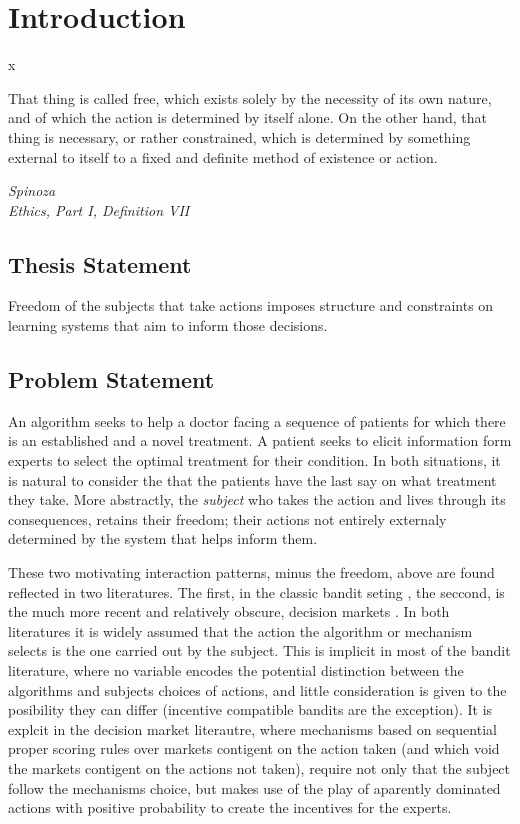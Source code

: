\chapter{Introduction}x
\label{cha:intro}



\epigraph{
That thing is called free, which exists solely by the necessity of its own nature, and of which the action is determined by itself alone. On the other hand, that thing is necessary, or rather constrained, which is determined by something external to itself to a fixed and definite method of existence or action.}{\textit{Spinoza \\Ethics, Part I, Definition VII}}


\section{Thesis Statement}
\label{sec:thesisstatement}

Freedom of the subjects that take actions imposes structure and constraints on learning systems that aim to inform those decisions. 

\section{Problem Statement}
\label{sec:problemstatement}


An algorithm seeks to help a doctor facing a sequence of patients for which there is an established and a novel treatment. A patient seeks to elicit information form experts to select the optimal treatment for their condition. In both situations, it is natural to consider the  that the patients have the last say on what treatment they take. More abstractly, the \emph{subject} who takes the action and lives through its consequences, retains their freedom; their actions not entirely externaly determined by the system that helps inform them.

These two motivating interaction patterns, minus the freedom, above are found reflected in two literatures. The first, in the classic bandit seting \cite{thompson:33,gittins1979bandit,bubeck:12}, the seccond, is the much more recent and relatively obscure, decision markets \cite{berg2003prediction,hanson2002decision,othman2010decision,boutilier2012eliciting,chen2014eliciting}. In both literatures it is widely assumed that the action the algorithm or mechanism selects is the one carried out by the subject. This is implicit in most of the bandit literature, where no variable encodes the potential distinction between the algorithms and subjects choices of actions, and little consideration is given to the posibility they can differ (incentive compatible bandits are the exception). It is explcit in the decision market literautre, where mechanisms based on sequential proper scoring rules over markets contigent on the action taken (and which void the markets contigent on the actions not taken), require not only that the subject follow the mechanisms choice, but makes use of the play of aparently dominated actions with positive probability to create the incentives for the experts. 

